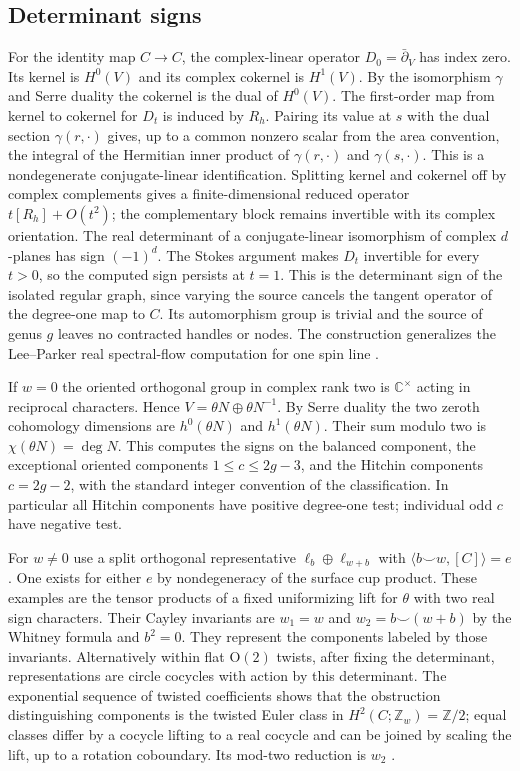 \subsection{Determinant signs}

For the identity map \(C\to C\), the complex-linear operator \(D_0=\bar\partial_V\) has index zero. Its kernel is \(H^0(V)\) and its complex cokernel is \(H^1(V)\). By the isomorphism \(\gamma\) and Serre duality the cokernel is the dual of \(H^0(V)\). The first-order map from kernel to cokernel for \(D_t\) is induced by \(R_h\). Pairing its value at \(s\) with the dual section \(\gamma(r,\cdot)\) gives, up to a common nonzero scalar from the area convention, the integral of the Hermitian inner product of \(\gamma(r,\cdot)\) and \(\gamma(s,\cdot)\). This is a nondegenerate conjugate-linear identification. Splitting kernel and cokernel off by complex complements gives a finite-dimensional reduced operator \(t[R_h]+O(t^2)\); the complementary block remains invertible with its complex orientation. The real determinant of a conjugate-linear isomorphism of complex \(d\)-planes has sign \((-1)^d\). The Stokes argument makes \(D_t\) invertible for every \(t>0\), so the computed sign persists at \(t=1\). This is the determinant sign of the isolated regular graph, since varying the source cancels the tangent operator of the degree-one map to \(C\). Its automorphism group is trivial and the source of genus \(g\) leaves no contracted handles or nodes. The construction generalizes the Lee--Parker real spectral-flow computation for one spin line \cite{lp} \cite{dwcount}.

If \(w=0\) the oriented orthogonal group in complex rank two is \(\mathbb C^\times\) acting in reciprocal characters. Hence \(V=\theta N\oplus\theta N^{-1}\). By Serre duality the two zeroth cohomology dimensions are \(h^0(\theta N)\) and \(h^1(\theta N)\). Their sum modulo two is \(\chi(\theta N)=\deg N\). This computes the signs on the balanced component, the exceptional oriented components \(1\le c\le2g-3\), and the Hitchin components \(c=2g-2\), with the standard integer convention of the classification. In particular all Hitchin components have positive degree-one test; individual odd \(c\) have negative test.

For \(w\ne0\) use a split orthogonal representative \(\ell_b\oplus\ell_{w+b}\) with \(\langle b\smile w,[C]\rangle=e\). One exists for either \(e\) by nondegeneracy of the surface cup product. These examples are the tensor products of a fixed uniformizing lift for \(\theta\) with two real sign characters. Their Cayley invariants are \(w_1=w\) and \(w_2=b\smile(w+b)\) by the Whitney formula and \(b^2=0\). They represent the components labeled by those invariants. Alternatively within flat \(\mathrm O(2)\) twists, after fixing the determinant, representations are circle cocycles with action by this determinant. The exponential sequence of twisted coefficients shows that the obstruction distinguishing components is the twisted Euler class in \(H^2(C;\mathbb Z_w)=\mathbb Z/2\); equal classes differ by a cocycle lifting to a real cocycle and can be joined by scaling the lift, up to a rotation coboundary. Its mod-two reduction is \(w_2\) \cite{bgg}.

